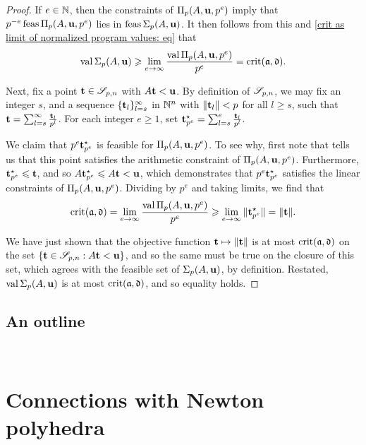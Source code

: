 \documentclass[11pt]{amsart}
\begin{document}
\begin{proof}
   If $e \in \mathbb{N}$, then the constraints of $\Pi_p(A, \mathbf{u}, p^e)$ imply that $p^{-e}  \operatorname{feas} \Pi_p(A, \mathbf{u}, p^e)$ lies in $\operatorname{feas} \Sigma_p(A,\mathbf{u})$.
   It then follows from this and \eqref{crit as limit of normalized program values: eq} that
   \[
      \operatorname{val}\Sigma_p(A,\mathbf{u}) \geqslant \displaystyle \lim_{e \to \infty}\frac{\operatorname{val}\Pi_p(A,\mathbf{u}, p^e)}{p^e} = \operatorname{crit}(\mathfrak{a}, \mathfrak{d}).
   \]

   Next, fix a point $\mathbf{t} \in \mathscr{S}_{p,n}$ with $A \mathbf{t} < \mathbf{u}$.
   By definition of $\mathscr{S}_{p,n}$, we may fix an integer $s$, and a sequence $\{ \mathbf{t}_l \}_{l=s}^\infty$ in $\mathbb{N}^n$ with $\| \mathbf{t}_l \| < p$ for all $l \geq s$, such that $\mathbf{t} = \sum_{l=s}^{\infty} \frac{\mathbf{t}_l}{p^l}$.
   For each integer $e \geq 1$, set $\mathbf{t}^\star_{p^e} = \sum_{l=s}^{e} \frac{\mathbf{t}_l}{p^l}$.

   We claim that $p^e  \mathbf{t}^\star_{p^e}$ is feasible for $\Pi_p(A, \mathbf{u}, p^e)$.
   To see why, first note that  tells us that this point satisfies the arithmetic constraint of $\Pi_p(A, \mathbf{u}, p^e)$.
   Furthermore, $\mathbf{t}^{\star}_{p^e} \leqslant \mathbf{t}$, and so $A \mathbf{t}^{\star}_{p^e} \leqslant A \mathbf{t} < \mathbf{u}$, which demonstrates that $p^e \mathbf{t}^\star_{p^e}$ satisfies the linear constraints of $\Pi_p(A, \mathbf{u}, p^e)$.
   Dividing by $p^e$ and taking limits, we find that
   \[
      \operatorname{crit}(\mathfrak{a}, \mathfrak{d}) = \lim_{e \to \infty} \frac{\operatorname{val} \Pi_p(A, \mathbf{u}, p^e)}{p^e} \geqslant \lim_{e \to \infty}   \| \mathbf{t}^\star_{p^e} \| = \| \mathbf{t} \|.
   \]

   We have just shown that the objective function $\mathbf{t} \mapsto \| \mathbf{t} \|$ is at most $\operatorname{crit}(\mathfrak{a}, \mathfrak{d})$ on the set $\{ \mathbf{t} \in \mathscr{S}_{p,n} : A \mathbf{t} < \mathbf{u} \}$, and so the same must be true on the closure of this set, which agrees with the feasible set of $\Sigma_p(A, \mathbf{u})$, by definition.
   Restated,  $ \operatorname{val} \Sigma_p(A, \mathbf{u})$ is at most $\operatorname{crit}(\mathfrak{a},  \mathfrak{d})$, and so equality holds.
\end{proof}

\subsection{An outline}

\ 

\newpage
\section{Connections with Newton polyhedra}
\end{document}

